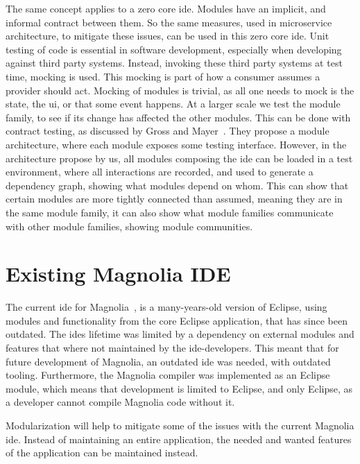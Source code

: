 The same concept applies to a zero core \gls*{ide}. Modules have an implicit, and
informal contract between them. So the same measures, used in microservice
architecture, to mitigate these issues, can be used in this zero core \gls*{ide}.
Unit testing of code is essential in software development, especially when
developing against third party systems. Instead, invoking these third party
systems at test time, mocking is used. This mocking is part of how a consumer
assumes a provider should act. Mocking of modules is trivial, as all one needs
to mock is the state, the \gls*{ui}, or that some event happens. At a larger
scale we test the module family, to see if its change has affected the other
modules. This can be done with contract testing, as discussed by Gross and Mayer~\cite{GROSS200322}.
They propose a module architecture, where each module exposes some testing
interface. However, in the architecture propose by us, all modules composing the
\gls*{ide} can be loaded in a test environment, where all interactions are
recorded, and used to generate a dependency graph, showing what modules depend
on whom. This can show that certain modules are more tightly connected than
assumed, meaning they are in the same module family, it can also show what
module families communicate with other module families, showing module
communities.

\section{Existing Magnolia IDE}

The current \gls*{ide} for Magnolia~\cite{baggeIde}, is a many-years-old version
of Eclipse, using modules and functionality from the core Eclipse application,
that has since been outdated. The \gls*{ide}s lifetime was limited by a
dependency on external modules and features that where not maintained by the
\gls*{ide}-developers. This meant that for future development of Magnolia, an
outdated \gls*{ide} was needed, with outdated tooling. Furthermore, the Magnolia
compiler was implemented as an Eclipse module, which means that development is
limited to Eclipse, and only Eclipse, as a developer cannot compile Magnolia
code without it.

Modularization will help to mitigate some of the issues with the current
Magnolia \gls*{ide}. Instead of maintaining an entire application, the needed and
wanted features of the application can be maintained instead.

